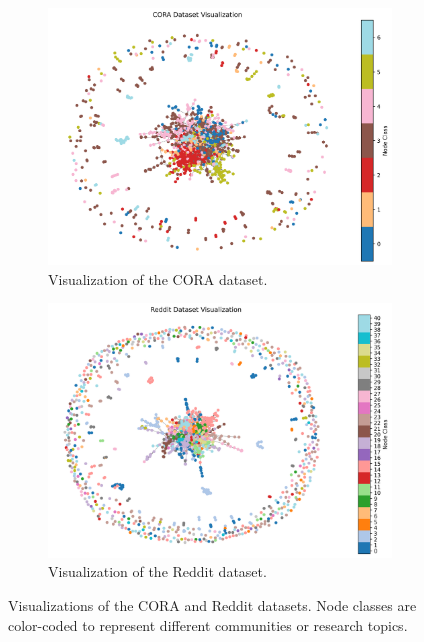 \documentclass{article}
\begin{document}
\begin{figure}[H]
    \centering
    \begin{subfigure}[b]{0.48\textwidth}
        \centering
        \includegraphics[width=\textwidth]{CORA_graph.png}
        \caption{Visualization of the CORA dataset.}
        \label{fig:cora}
    \end{subfigure}
    \hfill
    \begin{subfigure}[b]{0.48\textwidth}
        \centering
        \includegraphics[width=\textwidth]{Reddit_graph.png}
        \caption{Visualization of the Reddit dataset.}
        \label{fig:reddit}
    \end{subfigure}
    \caption{Visualizations of the CORA and Reddit datasets. Node classes are color-coded to represent different communities or research topics.}
    \label{fig:cora_reddit_side_by_side}
\end{figure}
\end{document}
